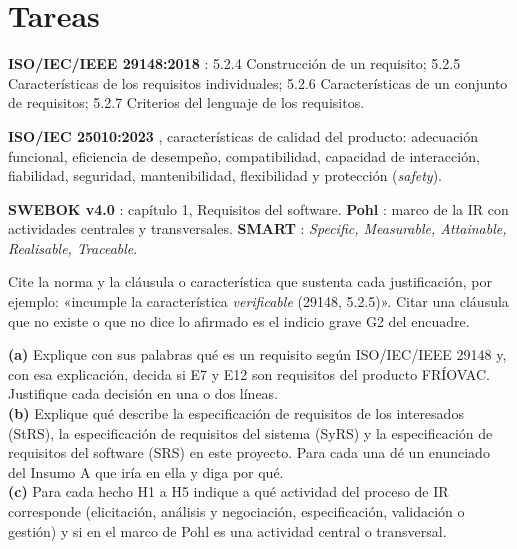 \documentclass[11pt]{article}
\newcommand{\seccion}[1]{\section{\textcolor{utegreendk}{#1}}}
\begin{document}
\seccion{Tareas}

\begin{cajaclave}[title={Referencias que puede citar (sin consultar los documentos)}]
	\textbf{ISO/IEC/IEEE 29148:2018} \citep{iso29148_2018}: 5.2.4 Construcción de un requisito; 5.2.5 Características de los requisitos individuales; 5.2.6 Características de un conjunto de requisitos; 5.2.7 Criterios del lenguaje de los requisitos.\par
	\textbf{ISO/IEC 25010:2023} \citep{iso25010_2023}, características de calidad del producto: adecuación funcional, eficiencia de desempeño, compatibilidad, capacidad de interacción, fiabilidad, seguridad, mantenibilidad, flexibilidad y protección (\emph{safety}).\par
	\textbf{SWEBOK v4.0} \citep{swebok_v4_2024}: capítulo 1, Requisitos del software. \textbf{Pohl} \citep{pohl_2025}: marco de la IR con actividades centrales y transversales. \textbf{SMART} \citep{mannion_smart_1995}: \emph{Specific, Measurable, Attainable, Realisable, Traceable}.\par
	Cite la norma y la cláusula o característica que sustenta cada justificación, por ejemplo: «incumple la característica \emph{verificable} (29148, 5.2.5)». Citar una cláusula que no existe o que no dice lo afirmado es el indicio grave G2 del encuadre.
\end{cajaclave}

\begin{cajatarea}[title={T1. Conceptos aplicados al caso \hfill D1 · 10\,\%}]
	\textbf{(a)} Explique con sus palabras qué es un requisito según ISO/IEC/IEEE 29148 y, con esa explicación, decida si E7 y E12 son requisitos del producto FRÍOVAC. Justifique cada decisión en una o dos líneas.\\[4pt]
	\textbf{(b)} Explique qué describe la especificación de requisitos de los interesados (StRS), la especificación de requisitos del sistema (SyRS) y la especificación de requisitos del software (SRS) en este proyecto. Para cada una dé un enunciado del Insumo A que iría en ella y diga por qué.\\[4pt]
	\textbf{(c)} Para cada hecho H1 a H5 indique a qué actividad del proceso de IR corresponde (elicitación, análisis y negociación, especificación, validación o gestión) y si en el marco de Pohl es una actividad central o transversal.
\end{cajatarea}
\end{document}
